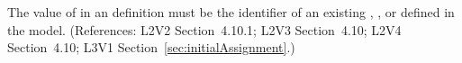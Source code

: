 The value of  in an \InitialAssignment definition must be the
identifier of an existing \Compartment, \Species, or \Parameter defined in
the model.  (References: L2V2 Section~4.10.1; L2V3
Section~4.10; L2V4 Section~4.10; L3V1 Section~\ref{sec:initialAssignment}.)
